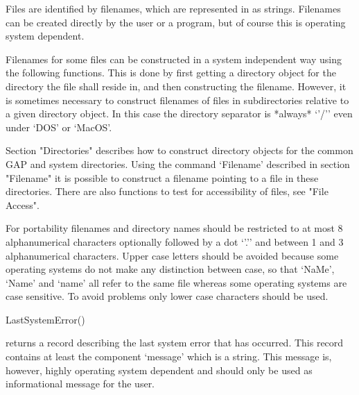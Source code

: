 


Files are identified by filenames, which are represented in {\GAP} as
strings.  Filenames can be created directly by the user or a program, but
of course this is operating system dependent.

Filenames for some files can  be constructed in  a system independent way
using the following functions.  This is done by first getting a directory
object for the directory the file shall  reside in, and then constructing
the filename.  However, it is  sometimes necessary to construct filenames
of files in subdirectories relative to a given directory object.  In this
case  the  directory separator is  *always*  `{'/'}' even under  `DOS' or
`MacOS'.

Section "Directories" describes how  to  construct directory objects
for the common GAP and system  directories.  Using the command `Filename'
described in  section "Filename" it  is possible  to construct a filename
pointing to a  file in  these  directories.  There are  also functions to
test for accessibility of files, see "File Access".


For portability filenames and directory  names should be restricted to at
most   8 alphanumerical characters  optionally followed  by a dot `{'.'}'
and between 1 and 3 alphanumerical characters.  Upper case letters should
be  avoided because some  operating systems  do  not make any distinction
between case,  so that `NaMe', `Name'  and  `name' all  refer to the same
file  whereas  some   operating  systems are case   sensitive.   To avoid
problems only lower case characters should be used.

\>LastSystemError()

returns  a  record describing the   last system error that  has occurred.
This record   contains  at least   the  component  `message' which   is a
string. This message is, however,  highly operating system dependent  and
should only be used as informational message for the user.

